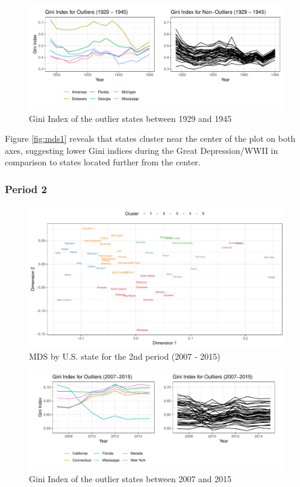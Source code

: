 \documentclass[11pt,a4paper,]{article}
\begin{document}
\begin{figure}
\centering
\includegraphics{Assignment_2_ETF5500_files/figure-latex/mds1-line-1.pdf}
\caption{\label{fig:mds1-line}Gini Index of the outlier states between 1929 and 1945}
\end{figure}

Figure \ref{fig:mds1} reveals that states cluster near the center of the plot on both axes, suggesting lower Gini indices during the Great Depression/WWII in comparison to states located further from the center.

\newpage

\hypertarget{period-2-1}{%
\subsubsection{Period 2}\label{period-2-1}}

\begin{figure}
\centering
\includegraphics{Assignment_2_ETF5500_files/figure-latex/mds2-1.pdf}
\caption{\label{fig:mds2}MDS by U.S. state for the 2nd period (2007 - 2015)}
\end{figure}

\begin{figure}
\centering
\includegraphics{Assignment_2_ETF5500_files/figure-latex/mds2-line-1.pdf}
\caption{\label{fig:mds2-line}Gini Index of the outlier states between 2007 and 2015}
\end{figure}
\end{document}
